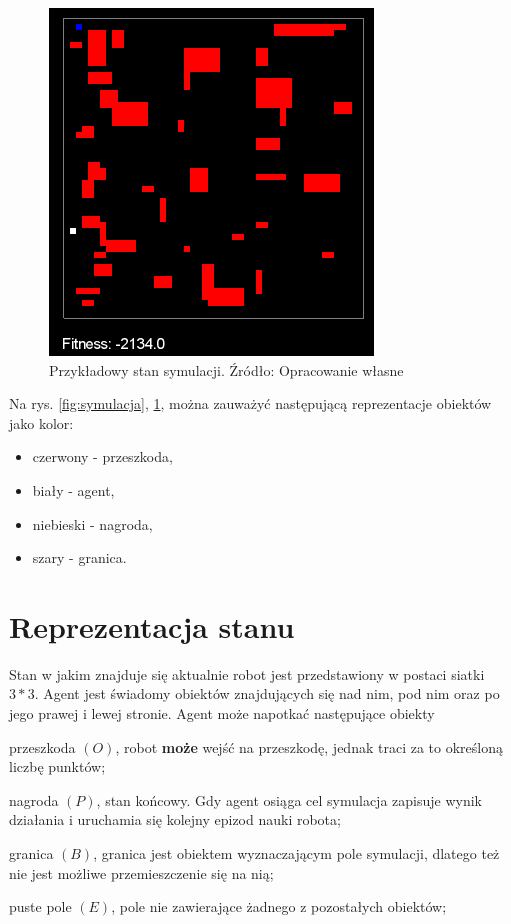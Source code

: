 \begin{figure}[h!]
    \centering
    \includegraphics[scale=0.4]{symulacja2}
    \caption{Przykładowy stan symulacji. Źródło: Opracowanie własne}
    \label{fig:symulacja2}
\end{figure}

Na rys. \ref{fig:symulacja}, \ref{fig:symulacja2}, można zauważyć następującą reprezentacje obiektów jako kolor:
\begin{itemize}
\renewcommand{\labelitemi}{$\bullet$}
 \item czerwony - przeszkoda,
 \item biały - agent,
 \item niebieski - nagroda,
 \item szary - granica.
\end{itemize}


\section{Reprezentacja stanu}
\label{sec:reprezentacjastanu}

Stan w jakim znajduje się aktualnie robot jest przedstawiony w postaci siatki $3*3$. Agent jest świadomy obiektów 
znajdujących się nad nim, pod nim oraz po jego prawej i lewej stronie.
Agent może napotkać następujące obiekty
\begin{description}
 \item przeszkoda $(O)$, robot \textbf{może} wejść na przeszkodę, jednak traci za to określoną liczbę punktów;
 \item nagroda $(P)$, stan końcowy. Gdy agent osiąga cel symulacja zapisuje wynik działania i uruchamia się kolejny 
epizod nauki robota;
 \item granica $(B)$, granica jest obiektem wyznaczającym pole symulacji, dlatego też nie jest możliwe przemieszczenie 
się na nią;
  \item puste pole $(E)$, pole nie zawierające żadnego z pozostałych obiektów;
\end{description}
 
